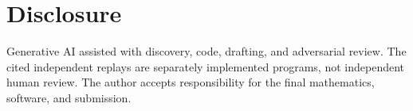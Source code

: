 \documentclass[11pt]{article}
\theoremstyle{remark}
\begin{document}
\section*{Disclosure}

Generative AI assisted with discovery, code, drafting, and adversarial review.
The cited independent replays are separately implemented programs, not
independent human review.  The author accepts responsibility for the final
mathematics, software, and submission.

{\small


}
\end{document}
